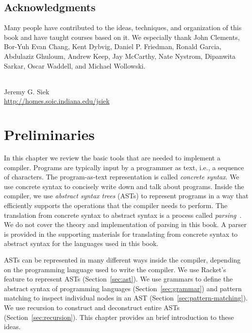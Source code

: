 \documentclass[11pt]{book}
\begin{document}
\section*{Acknowledgments}

Many people have contributed to the ideas, techniques, and
organization of this book and have taught courses based on it. We
especially thank John Clements, Bor-Yuh Evan Chang, Kent Dybvig,
Daniel P. Friedman, Ronald Garcia, Abdulaziz Ghuloum, Andrew Keep, Jay
McCarthy, Nate Nystrom, Dipanwita Sarkar, Oscar Waddell, and Michael
Wollowski.

\mbox{}\\
\noindent Jeremy G. Siek \\
\noindent \url{http://homes.soic.indiana.edu/jsiek} \\



\chapter{Preliminaries}
\label{ch:trees-recur}

In this chapter we review the basic tools that are needed to implement
a compiler. Programs are typically input by a programmer as text,
i.e., a sequence of characters. The program-as-text representation is
called \emph{concrete syntax}. We use concrete syntax to concisely
write down and talk about programs. Inside the compiler, we use
\emph{abstract syntax trees} (ASTs) to represent programs in a way
that efficiently supports the operations that the compiler needs to
perform.
%
The translation from concrete syntax to abstract syntax is a process
called \emph{parsing}~\cite{Aho:1986qf}. We do not cover the theory
and implementation of parsing in this book. A parser is provided in
the supporting materials for translating from concrete syntax to
abstract syntax for the languages used in this book.

ASTs can be represented in many different ways inside the compiler,
depending on the programming language used to write the compiler.
%
We use Racket's \href{https://docs.racket-lang.org/guide/define-struct.html}{}
feature to represent ASTs (Section~\ref{sec:ast}). We use grammars to
define the abstract syntax of programming languages (Section~\ref{sec:grammar})
and pattern matching to inspect individual nodes in an AST
(Section~\ref{sec:pattern-matching}).  We use recursion to construct
and deconstruct entire ASTs (Section~\ref{sec:recursion}).  This
chapter provides an brief introduction to these ideas.
\end{document}
